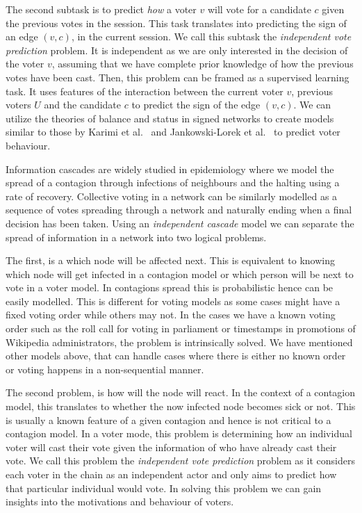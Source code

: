 The second subtask is to predict \textit{how} a voter $v$ will vote for a candidate $c$ given the previous votes in the session.
This task translates into predicting the sign of an edge $(v,c)$, in the current session.
We call this subtask the \textit{independent vote prediction} problem.
It is independent as we are only interested in the decision of the voter $v$, assuming that we have complete prior knowledge of how the previous votes have been cast.
Then, this problem can be framed as a supervised learning task.
It uses features of the interaction between the current voter $v$, previous voters $U$ and the candidate $c$ to predict the sign of the edge $(v,c)$.
We can utilize the theories of balance and status in signed networks to create models similar to those by Karimi et al.\ \cite{karimi2019multicongress} and Jankowski-Lorek et al.\ \cite{jankowski-lorek2013MBSN} to predict voter behaviour.

\iffalse
{}
Information cascades are widely studied in epidemiology where we model the spread of a contagion through infections of neighbours and the halting using a rate of recovery.
Collective voting in a network can be similarly modelled as a sequence of votes spreading through a network and naturally ending when a final decision has been taken.
Using an \textit{independent cascade} model we can separate the spread of information in a network into two logical problems.

The first, is a which node will be affected next.
This is equivalent to knowing which node will get infected in a contagion model or which person will be next to vote in a voter model.
In contagions spread this is probabilistic hence can be easily modelled.
This is different for voting models as some cases might have a fixed voting order while others may not.
In the cases we have a known voting order such as the roll call for voting in parliament or timestamps in promotions of Wikipedia administrators, the problem is intrinsically solved.
We have mentioned other models above, that can handle cases where there is either no known order or voting happens in a non-sequential manner. 

The second problem, is how will the node will react.
In the context of a contagion model, this translates to whether the now infected node becomes sick or not.
This is usually a known feature of a given contagion and hence is not critical to a contagion model.
In a voter mode, this problem is determining how an individual voter will cast their vote given the information of who have already cast their vote.
We call this problem the \textit{independent vote prediction} problem as it considers each voter in the chain as an independent actor and only aims to predict how that particular individual would vote.
In solving this problem we can gain insights into the motivations and behaviour of voters. 

